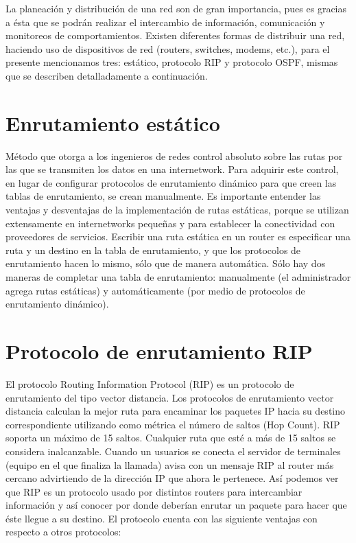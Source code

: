 \noindent
La planeación y distribución de una red son de gran importancia, pues es gracias a ésta que se podrán realizar el intercambio de información, comunicación y monitoreos de comportamientos. 
\newline
Existen diferentes formas de distribuir una red, haciendo uso de dispositivos de red (routers, switches, modems, etc.), para el presente mencionamos tres: estático, protocolo RIP y protocolo OSPF, mismas que se describen detalladamente a continuación. 

\section{Enrutamiento estático}

\noindent
Método que otorga a los ingenieros de redes control absoluto sobre las rutas por las que se transmiten los datos en una internetwork. Para adquirir este control, en lugar de configurar protocolos de enrutamiento dinámico para que creen las tablas de enrutamiento, se crean manualmente. Es importante entender las ventajas y desventajas de la implementación de rutas estáticas, porque se utilizan extensamente en internetworks pequeñas y para establecer la conectividad con proveedores de servicios. Escribir una ruta estática en un router es especificar una ruta y un destino en la tabla de enrutamiento, y que los protocolos de enrutamiento hacen lo mismo, sólo que de manera
automática. Sólo hay dos maneras de completar una tabla de enrutamiento: manualmente (el administrador agrega rutas estáticas) y automáticamente (por medio de protocolos de enrutamiento dinámico). \cite{estatico}

\section{Protocolo de enrutamiento RIP}

\noindent
El protocolo Routing Information Protocol (RIP) es un protocolo de enrutamiento del tipo vector distancia. Los protocolos de enrutamiento vector distancia calculan la mejor ruta para encaminar los paquetes IP hacia su destino correspondiente utilizando como métrica el número de saltos (Hop Count). RIP soporta un máximo de 15 saltos. Cualquier ruta que esté a más de 15 saltos se considera inalcanzable. 
\newline
Cuando un usuarios se conecta el servidor de terminales (equipo en el que finaliza la llamada) avisa con un mensaje RIP al router más cercano advirtiendo de la dirección IP que ahora le pertenece.
Así podemos ver que RIP es un protocolo usado por distintos routers para intercambiar información y así conocer por donde deberían enrutar un paquete para hacer que éste llegue a su destino.
\newline
El protocolo cuenta con las siguiente ventajas con respecto a otros protocolos:


